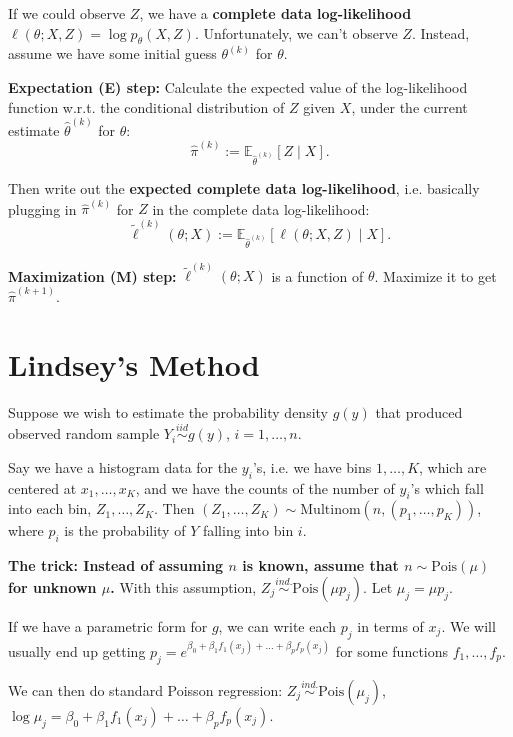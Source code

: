\documentclass[twoside]{article}
\newcommand\bbE{\mathbb{E}}
\def\t{\theta}
\begin{document}
If we could observe $Z$, we have a \textbf{complete data log-likelihood} $\ell(\t; X, Z) = \log p_\t(X, Z)$. Unfortunately, we can't observe $Z$. Instead, assume we have some initial guess $\t^{(k)}$ for $\t$.

\textbf{Expectation (E) step:} Calculate the expected value of the log-likelihood function w.r.t. the conditional distribution of $Z$ given $X$, under the current estimate $\hat{\t}^{(k)}$ for $\t$:
\begin{equation*}
\hat{\pi}^{(k)} := \bbE_{\hat{\t}^{(k)}} \left[ Z \mid X \right].
\end{equation*}

Then write out the \textbf{expected complete data log-likelihood}, i.e. basically plugging in $\hat{\pi}^{(k)}$ for $Z$ in the complete data log-likelihood:
\begin{equation*}
\tilde{\ell}^{(k)} (\t; X) := \bbE_{\hat{\t}^{(k)}} \left[ \ell(\t; X, Z) \mid X \right].
\end{equation*}


\textbf{Maximization (M) step:} $\tilde{\ell}^{(k)} (\t; X)$ is a function of $\t$. Maximize it to get $\hat{\pi}^{(k+1)}$.

\section{Lindsey's Method}
Suppose we wish to estimate the probability density $g(y)$ that produced observed random sample $Y_i \stackrel{iid}{\sim} g(y)$, $i = 1, \dots, n$.

Say we have a histogram data for the $y_i$'s, i.e. we have bins $1, \dots, K$, which are centered at $x_1, \dots, x_K$, and we have the counts of the number of $y_i$'s which fall into each bin, $Z_1, \dots, Z_K$. Then $(Z_1, \dots, Z_K) \sim \text{Multinom}(n, (p_1, \dots, p_K))$, where $p_i$ is the probability of $Y$ falling into bin $i$.

\textbf{The trick: Instead of assuming $n$ is known, assume that $n \sim \text{Pois}(\mu)$ for unknown $\mu$.} With this assumption, $Z_j \stackrel{ind.}{\sim} \text{Pois}(\mu p_j)$. Let $\mu_j = \mu p_j$.

If we have a parametric form for $g$, we can write each $p_j$ in terms of $x_j$. We will usually end up getting $p_j = e^{\beta_0 + \beta_1f_1(x_j) + \dots + \beta_p f_p(x_j)}$ for some functions $f_1, \dots, f_p$.

We can then do standard Poisson regression: $Z_j \stackrel{ind.}{\sim} \text{Pois}(\mu_j)$, $\log \mu_j = \beta_0 + \beta_1f_1(x_j) + \dots + \beta_p f_p(x_j)$.
\end{document}
